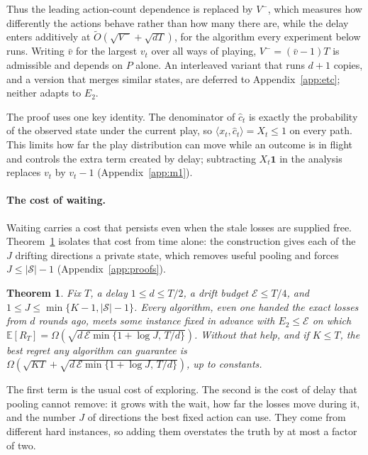 \documentclass{article}
\newtheorem{theorem}{Theorem}
\theoremstyle{remark}
\newcommand{\Ex}{\mathbb{E}}
\newcommand{\Ot}{\widetilde{O}}
\newcommand{\etwo}{E_2}
\newcommand{\Sset}{\mathcal{S}}
\begin{document}
Thus the leading action-count dependence is replaced by $V^-$, which measures how differently the
actions behave rather than how many there are, while the delay enters additively at $\Ot(\sqrt{V^-}+\sqrt{dT})$, for the algorithm every
experiment below runs. Writing $\bar v$ for the largest $v_t$ over all ways of playing,
$V^-=(\bar v-1)T$ is admissible and depends on $P$ alone. An interleaved variant that runs
$d+1$ copies, and a version that merges similar states, are deferred to
Appendix~\ref{app:etc}; neither adapts to $\etwo$.

The proof uses one key identity. The denominator of $\hat c_t$ is exactly the probability of the
observed state under the current play, so $\langle x_t,\hat c_t\rangle=X_t\le1$ on every path. This
limits how far the play distribution can move while an outcome is in flight and controls the extra
term created by delay; subtracting $X_t\mathbf 1$ in the analysis replaces $v_t$ by $v_t-1$
(Appendix~\ref{app:m1}).

\paragraph{The cost of waiting.}\label{sec:lower} Waiting carries a cost that persists even when the
stale losses are supplied free. Theorem~\ref{thm:lower} isolates that cost from time alone: the
construction gives each of the $J$ drifting directions a private state, which removes useful
pooling and forces $J\le|\Sset|-1$ (Appendix~\ref{app:proofs}).

\begin{theorem}\label{thm:lower}
Fix $T$, a delay $1\le d\le T/2$, a drift budget $\mathcal E\le T/4$, and
$1\le J\le\min\{K-1,|\Sset|-1\}$. Every algorithm, even one handed the exact losses from $d$ rounds
ago, meets some instance fixed in advance with $\etwo\le\mathcal E$ on which
$\Ex[R_T]=\Omega(\sqrt{d\,\mathcal E\min\{1+\log J,\,T/d\}})$. Without that help, and if $K\le T$,
the best regret any algorithm can guarantee is
$\Omega(\sqrt{KT}+\sqrt{d\,\mathcal E\min\{1+\log J,\,T/d\}})$, up to constants.
\end{theorem}

The first term is the usual cost of exploring. The second is the cost of delay that pooling cannot
remove: it grows with the
wait, how far the losses move during it, and the number $J$ of directions the best fixed action can
use. They come from different hard instances, so adding them overstates the truth by at most a
factor of two.
\end{document}
